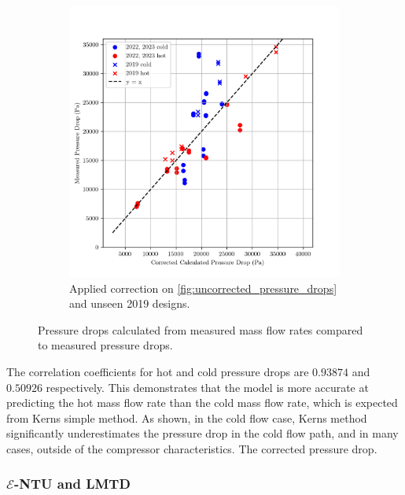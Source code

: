 \documentclass{article}
\begin{document}
\begin{figure}[H]
\begin{subfigure}{.49\textwidth}
    \includegraphics[width=.99\linewidth]{dp_ccalc_vs_meas.png}
    \caption{Applied correction on \ref{fig:uncorrected_pressure_drops} and unseen 2019 designs.}
    \label{fig:corrected_pressure_drops}
  \end{subfigure}
    
  \caption{Pressure drops calculated from measured mass flow rates compared to measured pressure drops.}
  \label{fig:pressure_drops}

\end{figure}

The correlation coefficients for hot and cold pressure drops are $\mathbf{0.93874}$ and $\mathbf{0.50926}$ respectively.
This demonstrates that the model is more accurate at predicting the hot mass flow rate than the cold mass flow rate,
which is expected from Kerns simple method.
As shown, in the cold flow case, Kerns method significantly underestimates the pressure drop in the cold flow path, and in many cases, outside of the compressor characteristics.
The corrected pressure drop.

\subsubsection{$\mathcal{E}$-NTU and LMTD}
\end{document}
